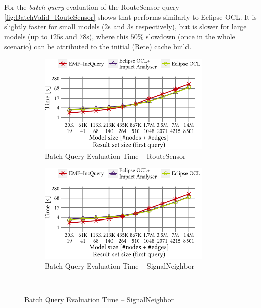 For the \emph{batch query} evaluation of the \textsf{RouteSensor} query
\autoref{fig:BatchValid_RouteSensor} shows that \incquery{} performs similarly
to Eclipse OCL. It is slightly faster for small models ($2$s and $3$s
respectively), but is slower for large models (up to $125$s and $78$s), where
this $50\%$ slowdown (once in the whole scenario) can be attributed to the
initial (Rete) cache build.


\begin{figure}[ht]
\begin{center}
	\begin{subfigure}[t]{0.48\textwidth}\centering
	    \includegraphics[width=0.9\textwidth]{figures/trainBenchmark_User_BatchValid_RouteSensor}
	    \caption{Batch Query Evaluation Time -- RouteSensor}
	    \label{fig:BatchValid_RouteSensor}
	\end{subfigure}
	\begin{subfigure}[t]{0.48\textwidth}\centering
	    \includegraphics[width=0.9\textwidth]{figures/trainBenchmark_User_BatchValid_RouteSensor}
	    \caption{Batch Query Evaluation Time -- SignalNeighbor}
	    \label{fig:BatchValid_SignalNeighbor}
	\end{subfigure} \\


\end{center}
\end{figure}
